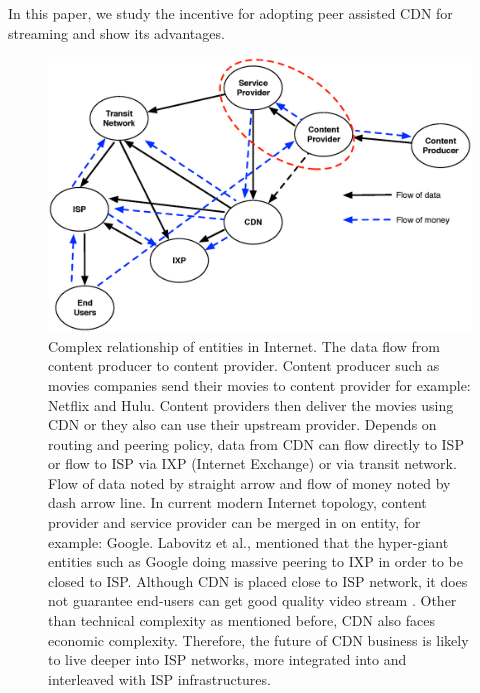 \documentclass[paper]{ieice}
\begin{document}
In this paper, we study the incentive for adopting peer assisted CDN
for streaming and show its advantages.


\begin{figure}[tb]
\begin{center}
\includegraphics[scale=0.4]{graphs/business-relationship.eps}
\end{center}
\caption{Complex relationship of entities in Internet.
The data flow from content producer to content provider. 
Content producer such as movies companies send their movies to content provider for example: Netflix and Hulu.
Content providers then deliver the movies using CDN or they also can use their upstream provider.
Depends on routing and peering policy, data from CDN can flow directly to ISP or flow to ISP via IXP (Internet Exchange) or via transit network. 
Flow of data noted by straight arrow and flow of money noted by dash arrow line.
In current modern Internet topology, content provider and service provider can be merged in on entity, for example: Google.
Labovitz et al.,\cite{Labovitz:2010:IIT:2043164.1851194} mentioned that the hyper-giant entities such as Google doing massive peering to IXP in order to be closed to ISP. 
Although CDN is placed close to ISP network, it does not guarantee end-users can get good quality video stream \cite{Krishnan:2009:MBE:1644893.1644917}.
Other than technical complexity as mentioned before, CDN also faces economic complexity\cite{dispute}.
Therefore, the future of CDN business is likely to live deeper into ISP networks, more integrated into and interleaved with ISP infrastructures.}
\label{fig:businessrelationship}
\vspace{-2mm}
\end{figure} 
\end{document}
